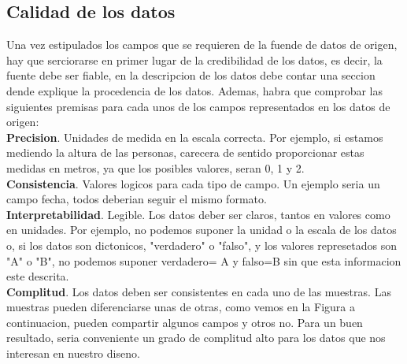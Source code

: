 \subsection{Calidad de los datos}
 
Una vez estipulados los campos que se requieren de la fuende de datos de origen, hay que serciorarse en primer lugar de la credibilidad
de los datos, es decir, la fuente debe ser fiable, en la descripcion de los datos debe contar una seccion dende explique la procedencia
de los datos. Ademas, habra que comprobar las siguientes premisas para cada unos de los campos representados en los datos de origen:\\

\textbf{Precision}. Unidades de medida en la escala correcta. Por ejemplo, si estamos mediendo la altura
de las personas, carecera de sentido proporcionar estas medidas en metros, ya que los posibles valores, seran 0, 1 y 2.\\

 \textbf{Consistencia}. Valores logicos para cada tipo de campo. Un ejemplo seria un campo fecha, todos deberian
seguir el mismo formato.\\

\textbf{Interpretabilidad}. Legible. Los datos deber ser claros, tantos en valores como en unidades. Por ejemplo, no podemos
suponer la unidad o la escala de los datos o, si los datos son dictonicos, "verdadero" o "falso", y los valores represetados son 
"A" o "B", no podemos suponer verdadero= A y falso=B sin que esta informacion este descrita. \\

\textbf{Complitud}. Los datos deben ser consistentes en cada uno de las muestras. Las muestras pueden diferenciarse
 unas de otras, como vemos en la Figura  a continuacion, pueden compartir algunos campos y otros no. Para un buen resultado, seria 
conveniente un grado de complitud alto para los datos que nos interesan en nuestro diseno.


